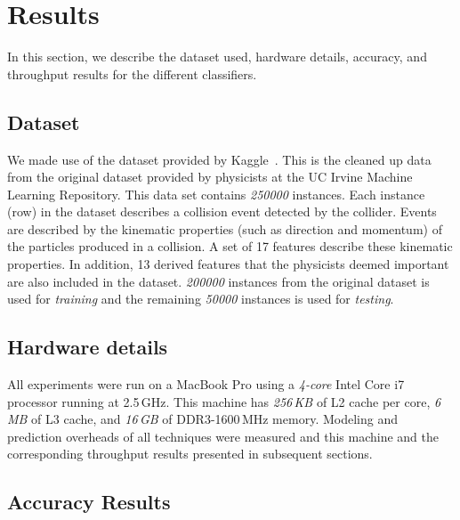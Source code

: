 \section{Results}
\label{sec:results}

In this section, we describe the dataset used, hardware details, accuracy, and throughput results for the different classifiers.

\subsection{Dataset}

We made use of the dataset provided by Kaggle~\cite{Kaggle}. This is the cleaned up data from the original dataset provided by physicists at the UC Irvine Machine Learning Repository. This data set contains \emph{250000} instances. Each instance (row) in the dataset describes a collision event detected by the collider. Events are described by the kinematic properties (such as direction and momentum) of the particles produced in a collision. A set of 17 features describe these kinematic properties. In addition, 13 derived features that the physicists deemed important are also included in the dataset. \emph{200000} instances from the original dataset is used for \emph{training} and the remaining \emph{50000} instances is used for \emph{testing}.

\subsection{Hardware details}

All experiments were run on a MacBook Pro using a \emph{4-core} Intel Core i7 processor running at 2.5\,GHz. This machine has \emph{256\,KB} of L2 cache per core, \emph{6\,MB} of L3 cache, and \emph{16\,GB} of DDR3-1600\,MHz memory. Modeling and prediction overheads of all techniques were measured and this machine and the corresponding throughput results presented in subsequent sections.

\subsection{Accuracy Results}


